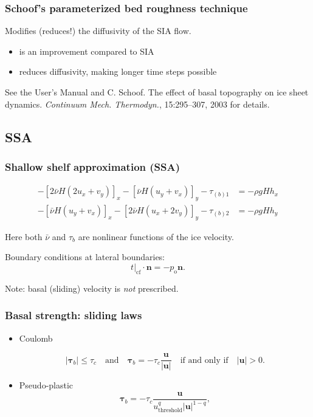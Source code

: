 \documentclass[hide notes,intlimits]{beamer}
\begin{document}
\begin{frame}
  \frametitle{Schoof's parameterized bed roughness technique}

  Modifies (reduces!) the diffusivity of the SIA flow.

  \begin{itemize}
  \item is an improvement compared to SIA
  \item reduces diffusivity, making longer time steps possible
  \end{itemize}

  See the User's Manual and C. Schoof. The effect of basal topography
  on ice sheet dynamics. \emph{Continuum Mech. Thermodyn.},
  15:295–307, 2003 for details.
\end{frame}

\subsection{SSA}
\label{sec:ssa}

\begin{frame}
  \frametitle{Shallow shelf approximation (SSA)}

  \begin{align}
    -\left[ 2\bar\nu H\left( 2u_{x} + v_{y}\right)\right]_{x} - \left[\bar\nu
    H\left(u_{y}+v_{x} \right) \right]_{y} - \tau_{(b)1} &= - \rho gH h_{x} \\
    -\left[ \bar\nu H\left( u_{y} + v_{x} \right)\right]_{x} - \left[2\bar\nu
    H\left(u_{x}+2v_{y}  \right) \right]_{y} - \tau_{(b)2} &= -\rho gH h_{y}
  \end{align}

  Here both $\bar \nu$ and $\tau_{b}$ are nonlinear functions of the ice velocity.

  Boundary conditions at lateral boundaries:
  \begin{equation}
    \label{eq:5}
    \left.t\right|_{\text{cf}} \cdot \mathbf{n} = -p_{\text{o}} \mathbf{n}.
  \end{equation}

  Note: basal (sliding) velocity is \emph{not} prescribed.

\end{frame}

\begin{frame}
  \frametitle{Basal strength: sliding laws}

  \begin{itemize}
  \item Coulomb

    \begin{equation}
      \label{eq:11}
      |\boldsymbol{\tau}_b| \le \tau_c \quad \text{and} \quad \boldsymbol{\tau}_b =
      - \tau_c \frac{\mathbf{u}}{|\mathbf{u}|} \quad\text{if and only if}\quad |\mathbf{u}| > 0.
    \end{equation}
  \item Pseudo-plastic
  \begin{equation}
    \label{eq:10}
    \boldsymbol{\tau}_b =  - \tau_c \frac{\mathbf{u}}{u_{\text{threshold}}^q |\mathbf{u}|^{1-q}},
  \end{equation}
  \end{itemize}
\end{frame}
\end{document}

